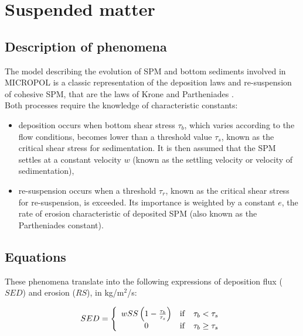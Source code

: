 \section{Suspended matter}

\subsection{Description of phenomena}

The model describing the evolution of SPM and bottom sediments involved in MICROPOL
is a classic representation of the deposition laws and re-suspension
of cohesive SPM, that are the laws of Krone \cite{krone_flume_1962}
and Partheniades \cite{partheniades_erosion_deposition_1965}.\\

Both processes require the knowledge of characteristic constants:

\begin{itemize}
\item deposition occurs when bottom shear stress $\tau_b$,
  which varies according to the flow conditions, becomes lower than a threshold value $\tau_s$,
  known as the critical shear stress for sedimentation.
  It is then assumed that the SPM settles at a constant velocity $w$
  (known as the settling velocity or velocity of sedimentation),
\item re-suspension occurs when a threshold $\tau_r$,
  known as the critical shear stress for re-suspension, is exceeded.
  Its importance is weighted by a constant $e$, the rate of erosion characteristic
  of deposited SPM (also known as the Partheniades constant).
\end{itemize}

\subsection{Equations}

These phenomena translate into the following expressions of deposition flux ($SED$) and erosion ($RS$),
in kg/m$^2$/s:

\begin{equation}
  SED = \left\{
    \begin{array}{ccl}
      wSS \left( 1 - \frac{\tau_b}{\tau_s} \right) & \rm{if} & \tau_b < \tau_s\\
      0 & \rm{if} & \tau_b \ge \tau_s
    \end{array}
    \right .
\end{equation}

